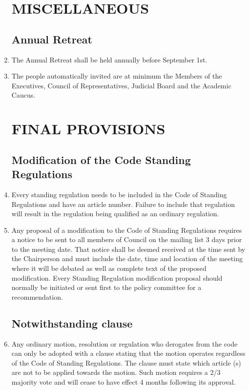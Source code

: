 \documentclass[oneside]{book}
\begin{document}
\begin{enumerate}
\part{\label{MISCELLANEOUS}MISCELLANEOUS }


\chapter{\label{Annual_Retreat}Annual Retreat }
\item The Annual Retreat shall be held annually before September 1st. 
\item The people automatically invited are at minimum the Members of the
Executives, Council of Representatives, Judicial Board and the Academic
Caucus. 

\part{\label{FINAL_PROVISIONS}FINAL PROVISIONS }


\chapter{\label{Modification_of_the_Code_Standing_Regulations}Modification
of the Code Standing Regulations }
\item Every standing regulation needs to be included in the Code of Standing
Regulations and have an article number. Failure to include that regulation
will result in the regulation being qualified as an ordinary regulation. 
\item Any proposal of a modification to the Code of Standing Regulations
requires a notice to be sent to all members of Council on the mailing
list 3 days prior to the meeting date. That notice shall be deemed
received at the time sent by the Chairperson and must include the
date, time and location of the meeting where it will be debated as
well as complete text of the proposed modification. Every Standing
Regulation modification proposal should normally be initiated or sent
first to the policy committee for a recommendation. 

\chapter{\label{Notwithstanding_clause}Notwithstanding clause }
\item Any ordinary motion, resolution or regulation who derogates from the
code can only be adopted with a clause stating that the motion operates
regardless of the Code of Standing Regulations. The clause must state
which article (s) are not to be applied towards the motion. Such motion
requires a 2/3 majority vote and will cease to have effect 4 months
following its approval. 


\end{enumerate}
\end{document}
